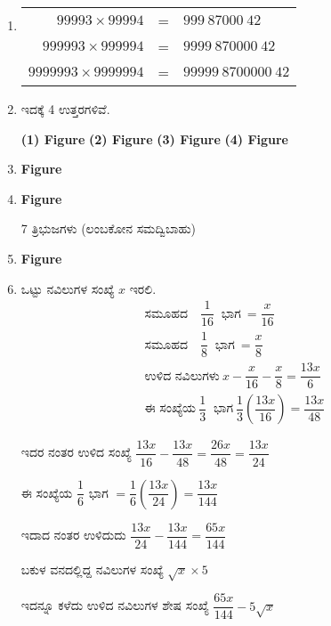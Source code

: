 \begin{enumerate}
\item 
\begin{tabular}[t]{rcl}
$99993\times 99994$ & = & $999~87000~42$\\
$999993\times 999994$ & = & $9999~870000~42$\\
$9999993\times 9999994$ & = & $99999~8700000~42$
\end{tabular}

\item ಇದಕ್ಕೆ 4 ಉತ್ತರಗಳಿವೆ. 
\begin{center}
{\bf (1) Figure}
{\bf (2) Figure}
{\bf (3) Figure}
{\bf (4) Figure}
\end{center}

\item 
\begin{center}
{\bf Figure}
\end{center}

\item 
\begin{center}
{\bf Figure}
\end{center}

7 ತ್ರಿಭುಜಗಳು (ಲಂಬಕೋನ ಸಮದ್ವಿಬಾಹು)

\item 
\begin{center}
{\bf Figure}
\end{center}

\item  ಒಟ್ಟು ನವಿಲುಗಳ ಸಂಖ್ಯೆ $x$ ಇರಲಿ. 
\begin{gather*}
\text{ಸಮೂಹದ}\quad\dfrac{1}{16} ~\text{ ಭಾಗ}~ = \dfrac{x}{16}\\
\text{ಸಮೂಹದ}\quad\dfrac{1}{8} ~\text{ ಭಾಗ}~ = \dfrac{x}{8}\\
\text{ಉಳಿದ ನವಿಲುಗಳು}~ x - \dfrac{x}{16} - \dfrac{x}{8} = \dfrac{13x}{6}\\
\text{ಈ ಸಂಖ್ಯೆಯ}~ \dfrac{1}{3} ~\text{ ಭಾಗ}~ \dfrac{1}{3}\left(\dfrac{13x}{16}\right) = \dfrac{13x}{48}
\end{gather*}

ಇದರ ನಂತರ ಉಳಿದ ಸಂಖ್ಯೆ $\dfrac{13x}{16} - \dfrac{13x}{48} = \dfrac{26x}{48} = \dfrac{13x}{24}$

ಈ ಸಂಖ್ಯೆಯ $\dfrac{1}{6}$ ಭಾಗ  $= \dfrac{1}{6} \left(\dfrac{13x}{24}\right) = \dfrac{13x}{144}$

ಇದಾದ ನಂತರ ಉಳಿದುದು $\dfrac{13x}{24} - \dfrac{13x}{144} = \dfrac{65x}{144}$

ಬಕುಳ ವನದಲ್ಲಿದ್ದ ನವಿಲುಗಳ ಸಂಖ್ಯೆ $\sqrt{x} \times 5$

ಇದನ್ನೂ ಕಳೆದು ಉಳಿದ ನವಿಲುಗಳ ಶೇಷ ಸಂಖ್ಯೆ $\dfrac{65x}{144} - 5\sqrt{x}$


\end{enumerate}
